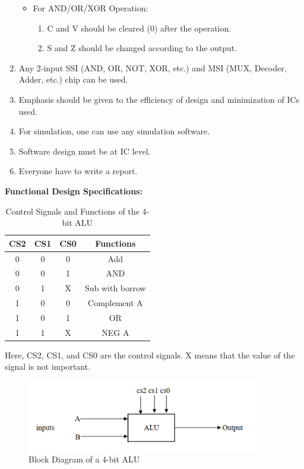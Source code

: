 \documentclass[11pt]{article}
\begin{document}
\begin{enumerate}
\begin{itemize}
\begin{enumerate}
            \end{enumerate}
        \item For AND/OR/XOR Operation:
            \begin{enumerate}
                \item C and V should be cleared (0) after the operation.
                \item S and Z should be changed according to the output.
            \end{enumerate}
    \end{itemize}
    \item Any 2-input SSI (AND, OR, NOT, XOR, etc.) and MSI (MUX, Decoder, Adder, etc.) 
    chip can be used.
    \item Emphasis should be given to the efficiency of design and minimization of ICs used.
    \item For simulation, one can use any simulation software.
    \item Software design must be at IC level.
    \item Everyone have to write a report.
\end{enumerate}
\textbf{Functional Design Specifications:}

\begin{table}[ht]
    \centering
    \begin{tabular}{|c|c|c|c|}
        \hline
        \textbf{CS2} & \textbf{CS1} & \textbf{CS0} & \textbf{Functions} \\
        \hline
        0 & 0 & 0 & Add \\
        \hline
        0 & 0 & 1 & AND \\
        \hline
        0 & 1 & X & Sub with borrow \\
        \hline
        1 & 0 & 0 & Complement A \\
        \hline
        1 & 0 & 1 & OR \\
        \hline
        1 & 1 & X & NEG A \\
        \hline
    \end{tabular}
    \caption{Control Signals and Functions of the 4-bit ALU}
\end{table}

Here, CS2, CS1, and CS0 are the control signals. X means that the value of the signal is not important.
\begin{figure}[ht]
    \centering
    \includegraphics[width=0.9\textwidth]{images/ALU2.png}
    \caption{Block Diagram of a 4-bit ALU}
\end{figure}
\end{document}
